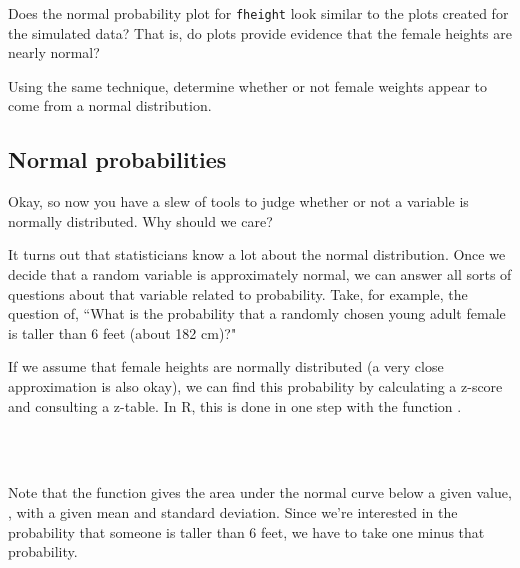 \documentclass[11pt]{article}
\begin{document}
\begin{exercise}
Does the normal probability plot for \texttt{fheight} look similar to the plots created for the simulated data?  That is, do plots provide evidence that the female heights are nearly normal?
\end{exercise}

\begin{exercise}
Using the same technique, determine whether or not female weights appear to come from a normal distribution.
\end{exercise}

%

\subsection*{Normal probabilities}
Okay, so now you have a slew of tools to judge whether or not a variable is normally distributed.  Why should we care?

It turns out that statisticians know a lot about the normal distribution.  Once we decide that a random variable is approximately normal, we can answer all sorts of questions about that variable related to probability.  Take, for example, the question of, ``What is the probability that a randomly chosen young adult female is taller than 6 feet (about 182 cm)?"

If we assume that female heights are normally distributed (a very close approximation is also okay), we can find this probability by calculating a z-score and consulting a z-table.  In R, this is done in one step with the function \texttt{}.

\ttfamily\noindent
\hlstd{}\hspace*{\fill}\\
\hlstd{}\hlkeyword{-}{\ }\hlkeyword{(}\hlargument{=}{\ }\hlkeyword{,}{\ }\hlargument{=}{\ }\hlkeyword{,}{\ }\hlargument{=}{\ }\hlkeyword{)}\hspace*{\fill}\\
\normalfont

Note that the function \texttt{} gives the area under the normal curve below a given value, \texttt{}, with a given mean and standard deviation.  Since we're interested in the probability that someone is taller than 6 feet, we have to take one minus that probability.
\end{document}
